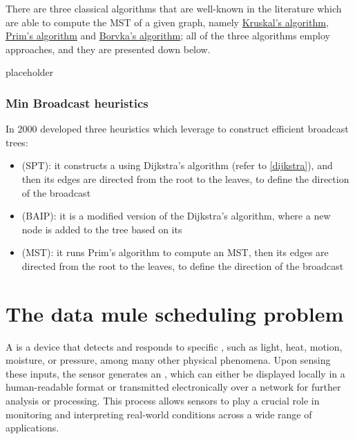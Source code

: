 \documentclass[a4paper, 12pt]{report}
\begin{document}
    There are three classical algorithms that are well-known in the literature which are able to compute the MST of a given graph, namely \href{https://en.wikipedia.org/wiki/Kruskal%27s_algorithm}{Kruskal's algorithm}, \href{https://en.wikipedia.org/wiki/Prim%27s_algorithm}{Prim's algorithm} and \href{https://en.wikipedia.org/wiki/Bor%C5%AFvka%27s_algorithm}{Borvka's algorithm}; all of the three algorithms employ \tbf{greedy} approaches, and they are presented down below.

    placeholder 
    
    \subsection{Min Broadcast heuristics}
    
    In 2000 \textcite{wieselthier} developed three heuristics which leverage  to construct efficient broadcast trees:

    \begin{itemize}
        \item {} (SPT): it constructs a  using Dijkstra's algorithm (refer to \cref{dijkstra}), and then its edges are directed from the root to the leaves, to define the direction of the broadcast
        \item {} (BAIP): it is a modified version of the Dijkstra's algorithm, where a new node is added to the tree based on its 
        \item {} (MST): it runs Prim's algorithm to compute an MST, then its edges are directed from the root to the leaves, to define the direction of the broadcast
    \end{itemize}
    
    \chapter{The data mule scheduling problem}

    A  is a device that detects and responds to specific , such as light, heat, motion, moisture, or pressure, among many other physical phenomena. Upon sensing these inputs, the sensor generates an , which can either be displayed locally in a human-readable format or transmitted electronically over a network for further analysis or processing. This process allows sensors to play a crucial role in monitoring and interpreting real-world conditions across a wide range of applications.
\end{document}
